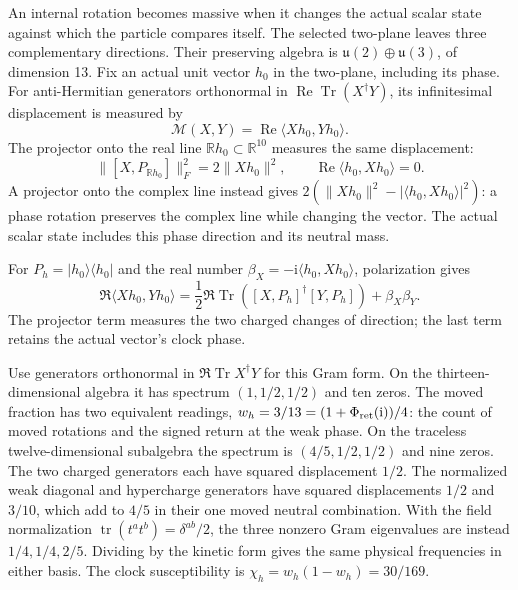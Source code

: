 \documentclass[aps,prx,onecolumn,10pt,notitlepage,nofootinbib,longbibliography]{revtex4-2}
\numberwithin{equation}{section}
\numberwithin{table}{section}
\newcommand{\RR}{\mathbb R}
\newcommand{\Tr}{\operatorname{Tr}}
\newcommand{\tr}{\operatorname{tr}}
\newcommand{\ii}{\mathrm i}
\newcommand{\Phis}{\Phi_{\rm ret}}
\begin{document}
An internal rotation becomes massive when it changes the actual scalar state against which the particle compares itself. The selected two-plane leaves three complementary directions. Their preserving algebra is $\mathfrak u(2)\oplus\mathfrak u(3)$, of dimension 13. Fix an actual unit vector $h_0$ in the two-plane, including its phase. For anti-Hermitian generators orthonormal in $\operatorname{Re}\Tr(X^\dagger Y)$, its infinitesimal displacement is measured by
\begin{equation}
 \mathcal M(X,Y)=\operatorname{Re}\langle Xh_0,Yh_0\rangle.
 \label{eq:vectorgram}
\end{equation}
The projector onto the real line $\RR h_0\subset\RR^{10}$ measures the same displacement:
\begin{equation}
 \|[X,P_{\RR h_0}]\|_F^2=2\|Xh_0\|^2,
 \qquad \operatorname{Re}\langle h_0,Xh_0\rangle=0.
 \label{eq:realvector}
\end{equation}
A projector onto the complex line instead gives
$2(\|Xh_0\|^2-|\langle h_0,Xh_0\rangle|^2)$: a phase rotation preserves the complex line while changing the vector. The actual scalar state includes this phase direction and its neutral mass.

For $P_h=|h_0\rangle\langle h_0|$ and the real number
$\beta_X=-\ii\langle h_0,Xh_0\rangle$, polarization gives
\begin{equation}
 \Re\langle Xh_0,Yh_0\rangle
 =\frac12\Re\Tr([X,P_h]^\dagger[Y,P_h])+\beta_X\beta_Y.
 \label{eq:weakgrambridge}
\end{equation}
The projector term measures the two charged changes of direction; the last
term retains the actual vector's clock phase.

Use generators orthonormal in $\Re\Tr X^\dagger Y$ for this Gram form. On the thirteen-dimensional algebra it has spectrum $(1,1/2,1/2)$ and ten zeros. The moved fraction has two equivalent readings, $w_h=3/13=(1+\Phis(\ii))/4$: the count of moved rotations and the signed return at the weak phase. On the traceless twelve-dimensional subalgebra the spectrum is $(4/5,1/2,1/2)$ and nine zeros. The two charged generators each have squared displacement $1/2$. The normalized weak diagonal and hypercharge generators have squared displacements $1/2$ and $3/10$, which add to $4/5$ in their one moved neutral combination. With the field normalization $\tr(t^at^b)=\delta^{ab}/2$, the three nonzero Gram eigenvalues are instead $1/4,1/4,2/5$. Dividing by the kinetic form gives the same physical frequencies in either basis. The clock susceptibility is $\chi_h=w_h(1-w_h)=30/169$.
\end{document}
